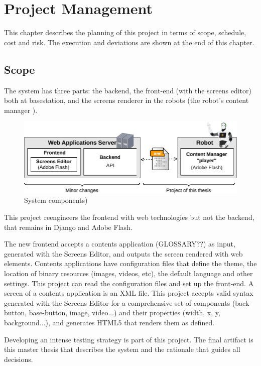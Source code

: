 \chapter{Project Management}
This chapter describes the planning of this project in terms of scope, schedule, cost and risk.
The execution and deviations are shown at the end of this chapter.

\section{Scope}
\label{sec:scope}
The system has three parts: the backend, the front-end (with the screens editor) both at basestation, and the screens renderer in the robots (the robot's content manager ).

\begin{figure}[htb]
    \centering
    \includegraphics[width=14cm]{figures/intro-system-overview}
    \caption{System components)}
    \label{fig:system-overview}
\end{figure}


This project reengineers the frontend with web technologies but not the backend, that remains in Django and Adobe Flash.

The new frontend accepts a contents application (GLOSSARY??) as input, generated with the Screens Editor, and outputs the screen rendered with web elements.
Contents applications have configuration files that define the theme, the location of binary resources (images, videos, etc), the default language and other settings. 
This project can read the configuration files and set up the front-end.
A screen of a contents application is an \ac{XML} file. 
This project accepts valid syntax generated with the Screens Editor for a comprehensive set of components (back-button, base-button, image, video...) and their properties (width, x, y, background...), and generates \ac{HTML5} that renders them as defined.

Developing an intense testing strategy is part of this project.
The final artifact is this master thesis that describes the system and the rationale that guides all decisions.

